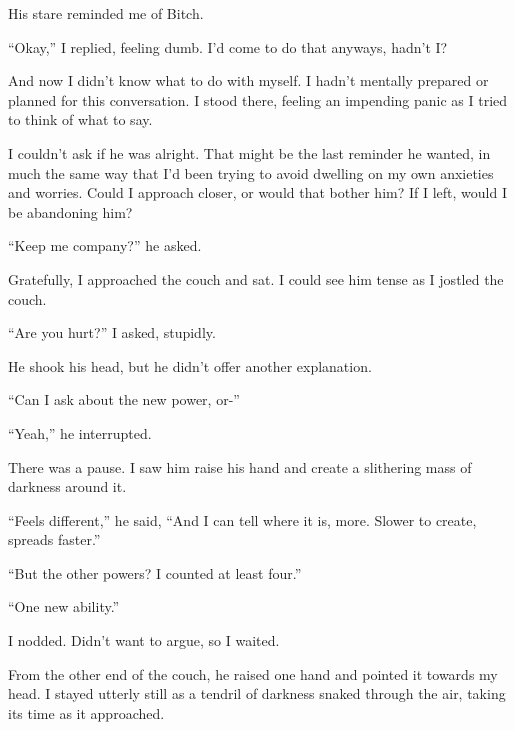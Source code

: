 His stare reminded me of Bitch.



``Okay,'' I replied, feeling dumb. I'd come to do that anyways, hadn't I?



And now I didn't know what to do with myself.  I hadn't mentally prepared or planned for this conversation.  I stood there, feeling an impending panic as I tried to think of what to say.



I couldn't ask if he was alright.  That might be the last reminder he wanted, in much the same way that I'd been trying to avoid dwelling on my own anxieties and worries.  Could I approach closer, or would that bother him?  If I left, would I be abandoning him?



``Keep me company?'' he asked.



Gratefully, I approached the couch and sat.  I could see him tense as I jostled the couch.



``Are you hurt?''  I asked, stupidly.



He shook his head, but he didn't offer another explanation.



``Can I ask about the new power, or-''



``Yeah,'' he interrupted.



There was a pause.  I saw him raise his hand and create a slithering mass of darkness around it.



``Feels different,'' he said, ``And I can tell where it is, more.  Slower to create, spreads faster.''



``But the other powers?  I counted at least four.''



``One new ability.''



I nodded.  Didn't want to argue, so I waited.



From the other end of the couch, he raised one hand and pointed it towards my head.  I stayed utterly still as a tendril of darkness snaked through the air, taking its time as it approached.



